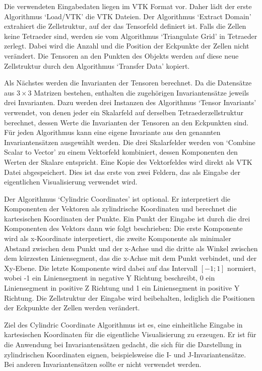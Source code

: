 \documentclass[a4paper,fontsize=12pt,toc=bib,halfparskip,ngerman]{scrartcl}
\begin{document}
Die verwendeten Eingabedaten liegen im VTK Format\cite{avila2010vtk} vor. Daher l\"adt der erste Algorithmus `Load/VTK' die VTK Dateien. Der Algorithmus `Extract Domain' extrahiert die Zellstruktur, auf der das Tensorfeld definiert ist. Falls die Zellen keine Tetraeder sind, werden sie vom Algorithmus `Triangulate Grid' in Tetraeder zerlegt. Dabei wird die Anzahl und die Position der Eckpunkte der Zellen nicht ver\"andert. Die Tensoren an den Punkten des Objekts werden auf diese neue Zellstruktur durch den Algorithmus `Transfer Data' kopiert. 

Als N\"achstes werden die Invarianten der Tensoren berechnet. Da die Datens\"atze aus $3\times3$ Matrizen bestehen, enthalten die zugeh\"origen Invariantens\"atze jeweils drei Invarianten. Dazu werden drei Instanzen des Algorithmus `Tensor Invariants' verwendet, von denen jeder ein Skalarfeld auf derselben Tetraederzellstruktur berechnet, dessen Werte die Invarianten der Tensoren an den Eckpunkten sind. F\"ur jeden Algorithmus kann eine eigene Invariante aus den genannten Invariantens\"atzen ausgew\"ahlt werden. Die drei Skalarfelder werden von `Combine Scalar to Vector' zu einem Vektorfeld kombiniert, dessen Komponenten den Werten der Skalare entspricht. Eine Kopie des Vektorfeldes wird direkt als VTK Datei abgespeichert. Dies ist das erste von zwei Feldern, das als Eingabe der eigentlichen Visualisierung verwendet wird.

Der Algorithmus `Cylindric Coordinates' ist optional. Er interpretiert die Komponenten der Vektoren als zylindrische Koordinaten und berechnet die kartesischen Koordinaten der Punkte. Ein Punkt der Eingabe ist durch die drei Komponenten des Vektors dann wie folgt beschrieben: Die erste Komponente wird als x-Koordinate interpretiert, die zweite Komponente als minimaler Abstand zwischen dem Punkt und der x-Achse und die dritte als Winkel zwischen dem k\"urzesten Liniensegment, das die x-Achse mit dem Punkt verbindet, und der Xy-Ebene. Die letzte Komponente wird dabei auf das Intervall $[-1;1]$ normiert, wobei -1 ein Liniensegment in negative Y Richtung beschreibt, 0 ein Liniensegment in positive Z Richtung und 1 ein Liniensegment in positive Y Richtung. Die Zellstruktur der Eingabe wird beibehalten, lediglich die Positionen der Eckpunkte der Zellen werden ver\"andert.

Ziel des Cylindric Coordinate Algorithmus ist es, eine einheitliche Eingabe in kartesischen Koordinaten f\"ur die eigentliche Visualisierung zu erzeugen. Er ist f\"ur die Anwendung bei Invariantens\"atzen gedacht, die sich f\"ur die Darstellung in zylindrischen Koordinaten eignen, beispielsweise die I- und J-Invariantens\"atze. Bei anderen Invariantens\"atzen sollte er nicht verwendet werden.
\end{document}
